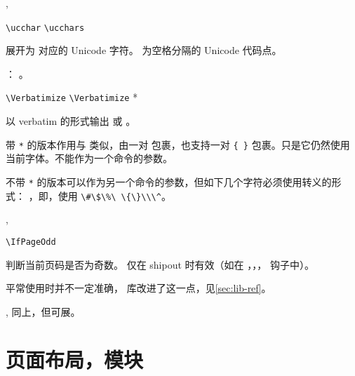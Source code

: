 \documentclass{whudoc}
\begin{document}
\begin{function}[rEXP]{\ucchar,\ucchars}
  \begin{syntax}
    \verb|\ucchar|  
    \verb|\ucchars| 
  \end{syntax}
展开为  对应的 Unicode 字符。 为空格分隔的 
Unicode 代码点。
\end{function}

\begin{xample}
：%
。
\stopxamplecode 
\xampleprint
\end{xample}

\begin{function}{\Verbatimize}
  \begin{syntax}
    \verb|\Verbatimize|   
    \verb|\Verbatimize| *   
  \end{syntax}
以 verbatim 的形式输出  或 。

带 \verb|*| 的版本作用与  类似，由一对  包裹，也支持一对 \verb|{ }| 包裹。只是它仍然使用当前字体。不能作为一个命令的参数。

不带 \verb|*| 的版本可以作为另一个命令的参数，但如下几个字符必须使用转义的形式：
\texttt{\Verbatimize{\#\$\%\ \{\}\\\^}}，即，使用 \verb|\#\$\%\ \{\}\\\^|。
\end{function}

\begin{function}{\IfPageOdd,\IfAbsPageOdd}
  \begin{syntax}
    \verb|\IfPageOdd|  
  \end{syntax}
判断当前页码是否为奇数。 仅在 shipout 时有效（如在 ，，，
 钩子中）。

平常使用时并不一定准确， 库改进了这一点，见\cref{sec:lib-ref}。
\end{function}

\begin{function}[EXP]{\@ifpageodd,\@ifabspageodd}
同上，但可展。
\end{function}


\section[float-barrier=on]{页面布局，模块}
\end{document}
